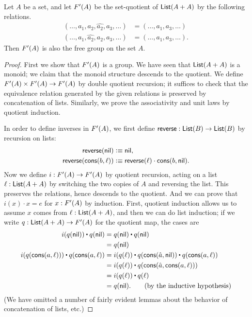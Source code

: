 \begin{thm}
  Let $A$ be a set, and let $F'(A)$ be the set-quotient of $\mathsf{List}(A+A)$ by the following relations.
  \begin{align*}
    (\dots,a_1,a_2,\widehat{a_2},a_3,\dots) &=
    (\dots,a_1,a_3,\dots)\\
    (\dots,a_1,\widehat{a_2},a_2,a_3,\dots) &=
    (\dots,a_1,a_3,\dots).
  \end{align*}
  Then $F'(A)$ is also the free group on the set $A$.
\end{thm}
\begin{proof}
  First we show that $F'(A)$ is a group.
  We have seen that $\mathsf{List}(A+A)$ is a monoid; we claim that the monoid structure descends to the quotient.
  We define $F'(A) \times F'(A) \to F'(A)$ by double quotient recursion; it suffices to check that the equivalence relation generated by the given relations is preserved by concatenation of lists.
  Similarly, we prove the associativity and unit laws by quotient induction.

  In order to define inverses in $F'(A)$, we first define $\mathsf{reverse}:\mathsf{List}(B)\to\mathsf{List}(B)$ by recursion on lists:
  \begin{align*}
    \mathsf{reverse}(\mathsf{nil}) &\vcentcolon\equiv \mathsf{nil},\\
    \mathsf{reverse}(\mathsf{cons}(b,\ell))&\vcentcolon\equiv \mathsf{reverse}(\ell)\cdot \mathsf{cons}(b,\mathsf{nil}).
  \end{align*}
  Now we define $i:F'(A)\to F'(A)$ by quotient recursion, acting on a list $\ell:\mathsf{List}(A+A)$ by switching the two copies of $A$ and reversing the list.
  This preserves the relations, hence descends to the quotient.
  And we can prove that $i(x) \cdot x = e$ for $x:F'(A)$ by induction.
  First, quotient induction allows us to assume $x$ comes from $\ell:\mathsf{List}(A+A)$, and then we can do list induction; if we write $q:\mathsf{List}(A+A)\to F'(A)$ for the quotient map, the cases are
  \begin{align*}
    i(q(\nil)) \ct q(\nil) &= q(\nil) \ct q(\nil)\\
    &= q(\nil)\\
    i(q(\cons(a,\ell))) \ct q(\cons(a,\ell)) &= i(q(\ell)) \ct q(\cons(\hat{a},\nil)) \ct q(\cons(a,\ell))\\
    &= i(q(\ell)) \ct q(\cons(\hat{a},\cons(a,\ell)))\\
    &= i(q(\ell)) \ct q(\ell)\\
    &= q(\nil). \tag{by the inductive hypothesis}
  \end{align*}
  (We have omitted a number of fairly evident lemmas about the behavior of concatenation of lists, etc.)


\end{proof}
